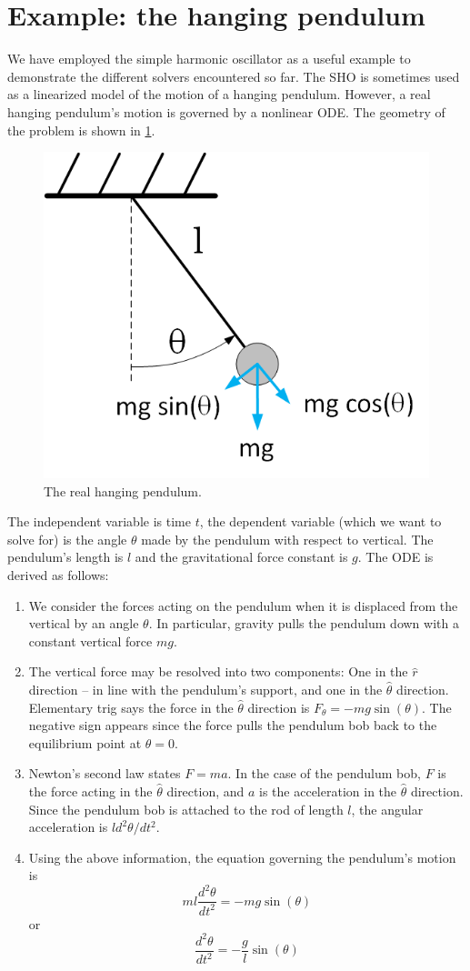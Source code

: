\documentclass[hidelinks,notitlepage]{book}
\begin{document}
\section{Example: the hanging pendulum}
We have employed the simple harmonic oscillator as a useful example to demonstrate the different solvers encountered so far.  The SHO is sometimes used as a linearized model of the motion of a hanging pendulum.  However, a real hanging pendulum's motion is governed by a nonlinear ODE.  The geometry of the problem is shown in \cref{fig:RealHangingPendulum}.  
\begin{figure}[tbh]
	\centering
	\includegraphics[width=0.3\columnwidth]{RealHangingPendulum.png}
	\caption{The real hanging pendulum.}
	\label{fig:RealHangingPendulum}
\end{figure}
The independent variable is time $t$, the dependent variable (which we want to solve for) is the angle $\theta$ made by the pendulum with respect to vertical.  The pendulum's length is $l$ and the gravitational force constant is $g$.  The ODE is derived as follows:
\begin{enumerate}
	\item We consider the forces acting on the pendulum when it is displaced from the vertical by an angle $\theta$.  In particular, gravity pulls the pendulum down with a constant vertical force $m g$.
	\item The vertical force may be resolved into two components:  One in the $\hat{r}$ direction -- in line with the pendulum's support, and one in the $\hat{\theta}$ direction.  Elementary trig says the force in the $\hat{\theta}$ direction is $F_{\theta} = -m g \sin(\theta)$.  The negative sign appears since the force pulls the pendulum bob back to the equilibrium point at $\theta = 0$.
	\item Newton's second law states $F = m a$.  In the case of the pendulum bob, $F$ is the force acting in the $\hat{\theta}$ direction, and $a$ is the acceleration in the $\hat{\theta}$ direction.  Since the pendulum bob is attached to the rod of length $l$, the angular acceleration is $l d^2 \theta / d t^2$.
	\item Using the above information, the equation governing the pendulum's motion is
	\begin{equation}
	\nonumber
	m l \frac{d^2 \theta}{d t^2} = -m g \sin(\theta)
	\end{equation}
	or 
	\begin{equation}
	\label{eq:NonlinearPendEq}
	\frac{d^2 \theta}{d t^2} = -\frac{g}{l} \sin(\theta)
	\end{equation}
\end{enumerate}
\end{document}
